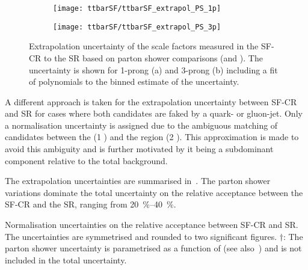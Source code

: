 \begin{figure}[htbp]
  \centering

  \begin{subfigure}[t]{.495\textwidth}
    \texttt{[image: ttbarSF/ttbarSF\_extrapol\_PS\_1p]}
    \caption{}
    \label{fig:ttbarSF_extrapol_shape_a}
  \end{subfigure}\hfill%
  \begin{subfigure}[t]{.495\textwidth}
    \texttt{[image: ttbarSF/ttbarSF\_extrapol\_PS\_3p]}
    \caption{}
    \label{fig:ttbarSF_extrapol_shape_b}
  \end{subfigure}

  \caption{Extrapolation uncertainty of the scale factors measured in
    the SF-CR to the \hadhad SR based on parton shower comparisons
    (\PYTHIA[8] and \HERWIG[7]). The uncertainty is shown for 1-prong
    (a) and 3-prong \faketauhadvis (b) including a fit of polynomials
    to the binned estimate of the uncertainty. }
  \label{fig:ttbarSF_extrapol_shape}
\end{figure}

A different approach is taken for the extrapolation uncertainty
between SF-CR and \hadhad SR for cases where both \tauhadvis
candidates are faked by a quark- or gluon-jet. Only a normalisation
uncertainty is assigned due to the ambiguous matching of \tauhadvis
candidates between the \lephad (1 \faketauhadvis) and the \hadhad
region (2 \faketauhadvis). This approximation is made to avoid this
ambiguity and is further motivated by it being a subdominant component
relative to the total \ttbarFakes background.

The extrapolation uncertainties are summarised
in~. The parton shower
variations dominate the total uncertainty on the relative acceptance
between the SF-CR and the SR, ranging from \SIrange{20}{40}{\percent}.

\begin{table}[htbp]
  \centering

  

  \caption{Normalisation uncertainties on the relative acceptance
    between SF-CR and SR. The uncertainties are symmetrised and
    rounded to two significant figures. $\dagger$: The parton shower
    uncertainty is parametrised as a function of \tauhadvis \pT (see
    also~) and is not included in the
    total uncertainty.}
  \label{tab:ttbarSF_acceptance_uncertainty}
\end{table}


